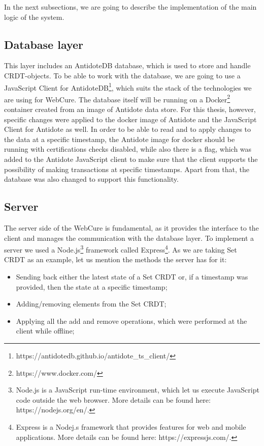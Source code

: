 In the next subsections, we are going to describe the implementation of the main logic of the system.

\subsection{Database layer}

This layer includes an AntidoteDB database, which is used to store and handle CRDT-objects. To be able to work with the database, we are going to use a JavaScript Client for AntidoteDB\footnote{https://antidotedb.github.io/antidote\_ts\_client/}, which suits the stack of the technologies we are using for WebCure. The database itself will be running on a Docker\footnote{https://www.docker.com/} container created from an image of Antidote data store. For this thesis, however, specific changes were applied to the docker image of Antidote and the JavaScript Client for Antidote as well. In order to be able to read and to apply changes to the data at a specific timestamp, the Antidote image for docker should be running with certifications checks disabled, while also there is a flag, which was added to the Antidote JavaScript client to make sure that the client supports the possibility of making transactions at specific timestamps. Apart from that, the database was also changed to support this functionality.

\subsection{Server}
\label{impl-server}

The server side of the WebCure is fundamental, as it provides the interface to the client and manages the communication with the database layer. To implement a server we used a Node.js\footnote{Node.js is a JavaScript run-time environment, which let us execute JavaScript code outside the web browser. More details can be found here: https://nodejs.org/en/.} framework called Express\footnote{Express is a Nodej.s framework that provides features for web and mobile applications. More details can be found here: https://expressjs.com/.}. As we are taking Set CRDT as an example, let us mention the methods the server has for it:

\begin{itemize}
    \item {Sending back either the latest state of a Set CRDT or, if a timestamp was provided, then the state at a specific timestamp;}
    \item {Adding/removing elements from the Set CRDT;}
    \item {Applying all the add and remove operations, which were performed at the client while offline;}
\end{itemize}

